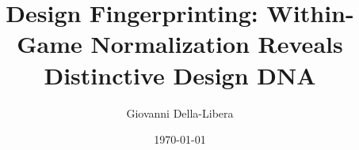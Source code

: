 \documentclass{article}
\title{Design Fingerprinting: Within-Game Normalization Reveals\\
Distinctive Design DNA}
\author{Giovanni Della-Libera}
\date{\today}
\begin{document}
\maketitle

\begin{abstract}

\end{abstract}










\end{document}
